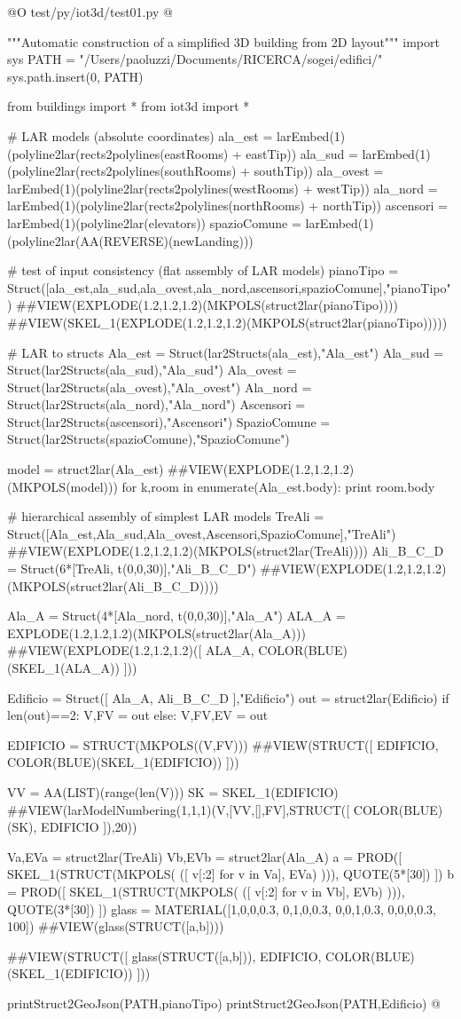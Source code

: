 \documentclass[11pt,oneside]{article}    %
\begin{document}
@O test/py/iot3d/test01.py
@{"""Automatic construction of a simplified 3D building from 2D layout"""
import sys
PATH = "/Users/paoluzzi/Documents/RICERCA/sogei/edifici/"
sys.path.insert(0, PATH)

from buildings import *
from iot3d import *

# LAR models (absolute coordinates)
ala_est = larEmbed(1)(polyline2lar(rects2polylines(eastRooms) + eastTip))
ala_sud = larEmbed(1)(polyline2lar(rects2polylines(southRooms) + southTip))
ala_ovest = larEmbed(1)(polyline2lar(rects2polylines(westRooms) + westTip))
ala_nord = larEmbed(1)(polyline2lar(rects2polylines(northRooms) + northTip)) 
ascensori = larEmbed(1)(polyline2lar(elevators))
spazioComune = larEmbed(1)(polyline2lar(AA(REVERSE)(newLanding)))

# test of input consistency (flat assembly of LAR models)
pianoTipo = Struct([ala_est,ala_sud,ala_ovest,ala_nord,ascensori,spazioComune],"pianoTipo")
##VIEW(EXPLODE(1.2,1.2,1.2)(MKPOLS(struct2lar(pianoTipo))))
##VIEW(SKEL_1(EXPLODE(1.2,1.2,1.2)(MKPOLS(struct2lar(pianoTipo)))))

# LAR to structs
Ala_est = Struct(lar2Structs(ala_est),"Ala_est")
Ala_sud = Struct(lar2Structs(ala_sud),"Ala_sud")
Ala_ovest = Struct(lar2Structs(ala_ovest),"Ala_ovest")
Ala_nord = Struct(lar2Structs(ala_nord),"Ala_nord")
Ascensori = Struct(lar2Structs(ascensori),"Ascensori")
SpazioComune = Struct(lar2Structs(spazioComune),"SpazioComune")

model = struct2lar(Ala_est)
##VIEW(EXPLODE(1.2,1.2,1.2)(MKPOLS(model)))
for k,room in enumerate(Ala_est.body):
    print room.body

# hierarchical assembly of simplest LAR models
TreAli = Struct([Ala_est,Ala_sud,Ala_ovest,Ascensori,SpazioComune],"TreAli")
##VIEW(EXPLODE(1.2,1.2,1.2)(MKPOLS(struct2lar(TreAli))))
Ali_B_C_D = Struct(6*[TreAli, t(0,0,30)],"Ali_B_C_D")
##VIEW(EXPLODE(1.2,1.2,1.2)(MKPOLS(struct2lar(Ali_B_C_D))))

Ala_A = Struct(4*[Ala_nord,  t(0,0,30)],"Ala_A")
ALA_A = EXPLODE(1.2,1.2,1.2)(MKPOLS(struct2lar(Ala_A)))
##VIEW(EXPLODE(1.2,1.2,1.2)([ ALA_A, COLOR(BLUE)(SKEL_1(ALA_A)) ]))

Edificio = Struct([ Ala_A, Ali_B_C_D ],"Edificio")
out = struct2lar(Edificio)
if len(out)==2: V,FV = out
else: V,FV,EV = out

EDIFICIO = STRUCT(MKPOLS((V,FV)))
##VIEW(STRUCT([ EDIFICIO, COLOR(BLUE)(SKEL_1(EDIFICIO)) ]))

VV = AA(LIST)(range(len(V)))
SK = SKEL_1(EDIFICIO)
##VIEW(larModelNumbering(1,1,1)(V,[VV,[],FV],STRUCT([ COLOR(BLUE)(SK), EDIFICIO ]),20))

Va,EVa = struct2lar(TreAli)
Vb,EVb = struct2lar(Ala_A)
a = PROD([ SKEL_1(STRUCT(MKPOLS( ([ v[:2] for v in Va], EVa) ))), QUOTE(5*[30]) ])
b = PROD([ SKEL_1(STRUCT(MKPOLS( ([ v[:2] for v in Vb], EVb) ))), QUOTE(3*[30]) ])
glass = MATERIAL([1,0,0,0.3,  0,1,0,0.3,  0,0,1,0.3, 0,0,0,0.3, 100])
##VIEW(glass(STRUCT([a,b])))

##VIEW(STRUCT([ glass(STRUCT([a,b])), EDIFICIO, COLOR(BLUE)(SKEL_1(EDIFICIO)) ]))


printStruct2GeoJson(PATH,pianoTipo)
printStruct2GeoJson(PATH,Edificio)
@}
\end{document}
